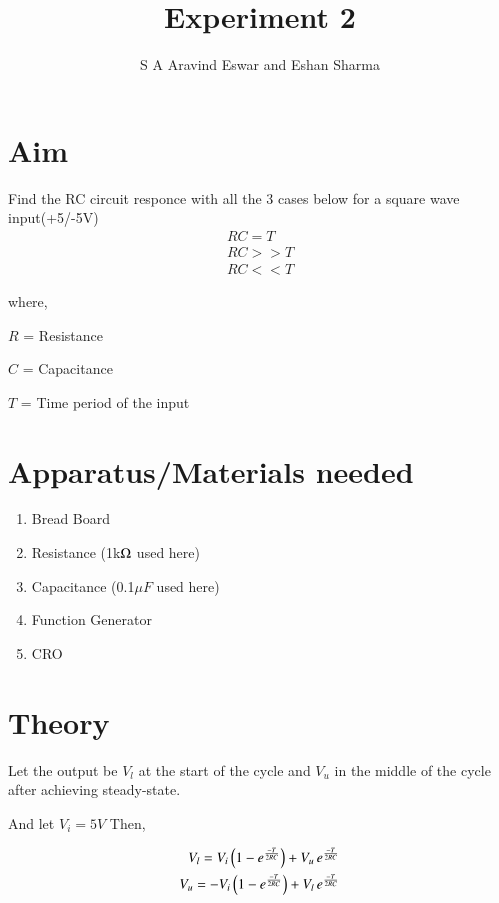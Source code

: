 \documentclass[journal]{IEEEtran}
\begin{document}

\vspace{3cm}

\title{Experiment 2} 
\author{S A Aravind Eswar and Eshan Sharma}
{\let\newpage\relax\maketitle}

\section{Aim}

Find the RC circuit responce with all the 3 cases below for a square wave input(+5/-5V)
\begin{align*}
    RC=T\\
    RC>>T\\
    RC<<T
\end{align*}

where,

    
$R$ = Resistance

$C$ = Capacitance

$T$ = Time period of the input


\section{Apparatus/Materials needed}
\begin{enumerate}
    \item Bread Board
    \item Resistance (1k$\ohm$ used here)
    \item Capacitance (0.1$\mu F$ used here)
    \item Function Generator
    \item CRO
\end{enumerate}

\section{Theory}

Let the output be $V_l$ at the start of the cycle and $V_u$ in the middle of the cycle after achieving steady-state.

And let $V_i = 5V$
Then,

\begin{align}
    V_l = V_i\left(1-e^{\frac{-T}{2RC}}\right) + V_u\,e^{\frac{-T}{2RC}}\\
    V_u = -V_i\left(1-e^{\frac{-T}{2RC}}\right) + V_l\,e^{\frac{-T}{2RC}}
\end{align}
\end{document}
